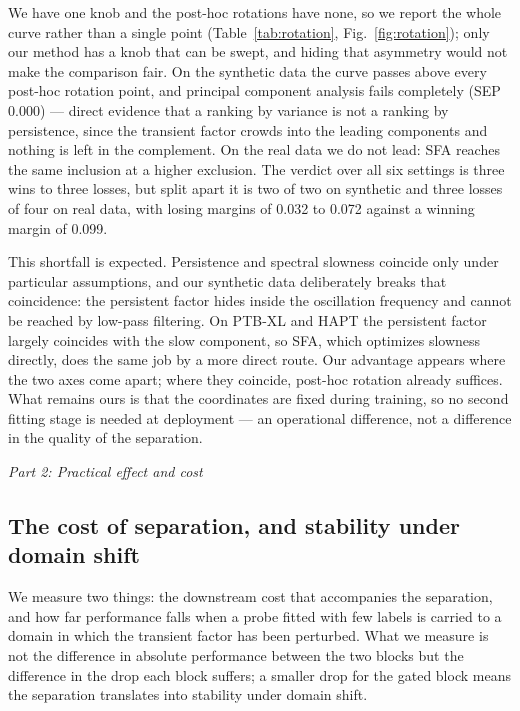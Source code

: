 We have one knob and the post-hoc rotations have none, so we report the whole curve rather than a single point (Table~\ref{tab:rotation}, Fig.~\ref{fig:rotation}); only our method has a knob that can be swept, and hiding that asymmetry would not make the comparison fair. On the synthetic data the curve passes above every post-hoc rotation point, and principal component analysis fails completely (SEP 0.000) --- direct evidence that a ranking by variance is not a ranking by persistence, since the transient factor crowds into the leading components and nothing is left in the complement. On the real data we do not lead: SFA reaches the same inclusion at a higher exclusion. The verdict over all six settings is three wins to three losses, but split apart it is two of two on synthetic and three losses of four on real data, with losing margins of 0.032 to 0.072 against a winning margin of 0.099.

This shortfall is expected. Persistence and spectral slowness coincide only under particular assumptions, and our synthetic data deliberately breaks that coincidence: the persistent factor hides inside the oscillation frequency and cannot be reached by low-pass filtering. On PTB-XL and HAPT the persistent factor largely coincides with the slow component, so SFA, which optimizes slowness directly, does the same job by a more direct route. Our advantage appears where the two axes come apart; where they coincide, post-hoc rotation already suffices. What remains ours is that the coordinates are fixed during training, so no second fitting stage is needed at deployment --- an operational difference, not a difference in the quality of the separation.

\medskip
\noindent\textit{Part 2: Practical effect and cost}

\subsection{The cost of separation, and stability under domain shift}

We measure two things: the downstream cost that accompanies the separation, and how far performance falls when a probe fitted with few labels is carried to a domain in which the transient factor has been perturbed. What we measure is not the difference in absolute performance between the two blocks but the difference in the drop each block suffers; a smaller drop for the gated block means the separation translates into stability under domain shift.



